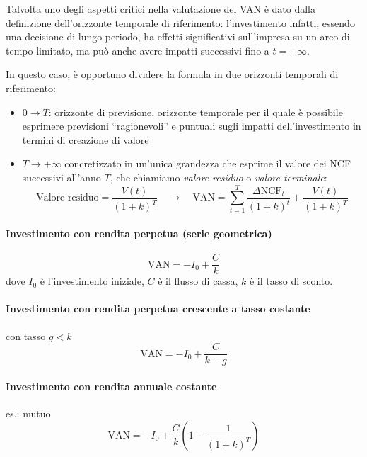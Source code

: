 Talvolta uno degli aspetti critici nella valutazione del VAN è dato dalla definizione dell’orizzonte temporale di
riferimento: l’investimento infatti, essendo una decisione di lungo periodo, ha effetti significativi
sull’impresa su un arco di tempo limitato, ma può anche avere impatti successivi fino a $t = +\infty$.

In questo caso, è opportuno dividere la formula in due orizzonti temporali di riferimento:
\begin{itemize}
    \item $0 \rightarrow T$: orizzonte di previsione, orizzonte temporale per il quale è possibile esprimere previsioni “ragionevoli” e puntuali sugli impatti dell’investimento in termini di creazione di valore
    \item $T \rightarrow +\infty$ concretizzato in un’unica grandezza che esprime il valore dei NCF successivi all’anno $T$, che
    chiamiamo \emph{valore residuo} o \emph{valore terminale}:
    \begin{equation*}
        \text{Valore residuo} = \frac{V(t)}{(1+k)^T} \quad\longrightarrow\quad
        \text{VAN} = \sum_{t=1}^T \frac{\Delta \text{NCF}_t}{(1+k)^t} + \frac{V(t)}{(1+k)^T}
    \end{equation*}
\end{itemize}
\paragraph{Investimento con rendita perpetua (serie geometrica)}
\begin{equation*}
    \text{VAN} = -I_0 + \frac{C}{k}
\end{equation*}
dove $I_0$ è l'investimento iniziale, $C$ è il flusso di cassa, $k$ è il tasso di sconto.

\paragraph{Investimento con rendita perpetua crescente a tasso costante} con tasso $g < k$
\begin{equation*}
    \text{VAN} = -I_0 + \frac{C}{k-g}
\end{equation*}

\paragraph{Investimento con rendita annuale costante} es.: mutuo
\begin{equation*}
    \text{VAN} = -I_0 + \frac{C}{k} \left(1-\frac{1}{(1+k)^T}\right)
\end{equation*}


